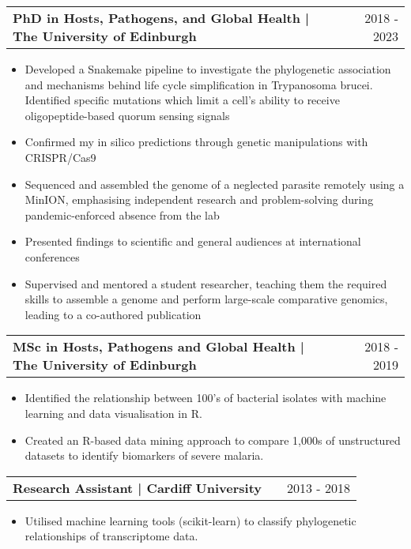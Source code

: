 \documentclass[a4paper,11pt]{article}
\makeatletter
\newenvironment{joblong}[2]{
  \begin{tabularx}{\linewidth}{@{}l X r@{}}
  \textbf{#1} & & #2 \\[2pt]
  \end{tabularx}
  \begin{itemize}[leftmargin=1.2em, itemsep=3pt, label=-]
}{
  \end{itemize}
}
\makeatother
\begin{document}
\begin{joblong}{PhD in Hosts, Pathogens, and Global Health | The University of Edinburgh}{2018 - 2023}
\item Developed a Snakemake pipeline to investigate the phylogenetic association and mechanisms behind life cycle simplification in Trypanosoma brucei. Identified specific mutations which limit a cell's ability to receive oligopeptide-based quorum sensing signals
\item Confirmed my in silico predictions through genetic manipulations with CRISPR/Cas9
\item Sequenced and assembled the genome of a neglected parasite remotely using a MinION, emphasising independent research and problem-solving during pandemic-enforced absence from the lab
\item Presented findings to scientific and general audiences at international conferences
\item Supervised and mentored a student researcher, teaching them the required skills to assemble a genome and perform large-scale comparative genomics, leading to a co-authored publication
\end{joblong}

\begin{joblong}{MSc in Hosts, Pathogens and Global Health | The University of Edinburgh}{2018 - 2019}
\item Identified the relationship between 100's of bacterial isolates with machine learning and data visualisation in R. 
\item Created an R-based data mining approach to compare 1,000s of unstructured datasets to identify biomarkers of severe malaria.
\end{joblong}

\begin{joblong}{Research Assistant | Cardiff University}{2013 - 2018}
\item Utilised machine learning tools (scikit-learn) to classify phylogenetic relationships of transcriptome data.
\end{joblong}

\end{document}
